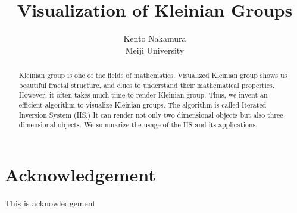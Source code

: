 \documentclass[uplatex, dvipdfmx]{article}
\title{ Visualization of Kleinian Groups }
\author{ Kento Nakamura\\
Meiji University\\
}
\date{}
\begin{document}
\maketitle

\begin{abstract}
 Kleinian group is one of the fields of mathematics. Visualized
 Kleinian group shows us beautiful fractal structure, and clues to
 understand their mathematical properties.
 However, it often takes much time to render Kleinian group.
 Thus, we invent an efficient algorithm to visualize Kleinian groups. 
 The algorithm is called Iterated Inversion System
 (IIS.) It can render not only two dimensional objects but also three
 dimensional objects.
 We summarize the usage of the IIS and its applications.
\end{abstract}

\clearpage

\tableofcontents

\clearpage

\section*{Acknowledgement}
This is acknowledgement









\printbibliography
\end{document}
